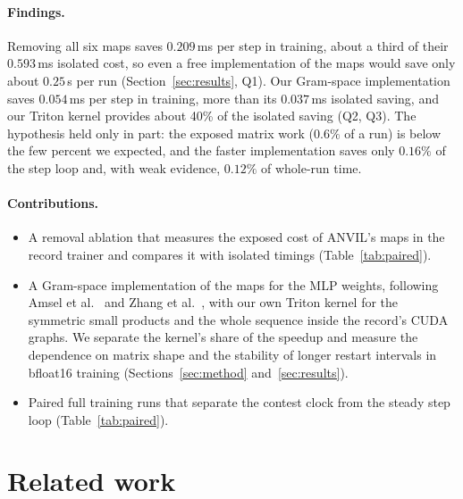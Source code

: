 \documentclass{article}
\begin{document}
\paragraph{Findings.} Removing all six maps saves $0.209$\,ms per step in training, about a third of their $0.593$\,ms isolated cost, so even a free implementation of the maps would save only about $0.25$\,s per run (Section~\ref{sec:results}, Q1). Our Gram-space implementation saves $0.054$\,ms per step in training, more than its $0.037$\,ms isolated saving, and our Triton kernel provides about 40\% of the isolated saving (Q2, Q3). The hypothesis held only in part: the exposed matrix work ($0.6\%$ of a run) is below the few percent we expected, and the faster implementation saves only $0.16\%$ of the step loop and, with weak evidence, $0.12\%$ of whole-run time.

\paragraph{Contributions.}
\begin{itemize}\setlength\itemsep{0pt}\setlength\parskip{0pt}
\item A removal ablation that measures the exposed cost of ANVIL's maps in the record trainer and compares it with isolated timings (Table~\ref{tab:paired}).
\item A Gram-space implementation of the maps for the MLP weights, following Amsel et al.~\cite{polar} and Zhang et al.~\cite{gramns}, with our own Triton kernel for the symmetric small products and the whole sequence inside the record's CUDA graphs. We separate the kernel's share of the speedup and measure the dependence on matrix shape and the stability of longer restart intervals in bfloat16 training (Sections~\ref{sec:method} and~\ref{sec:results}).
\item Paired full training runs that separate the contest clock from the steady step loop (Table~\ref{tab:paired}).
\end{itemize}

\section{Related work}\label{sec:related}
\end{document}
